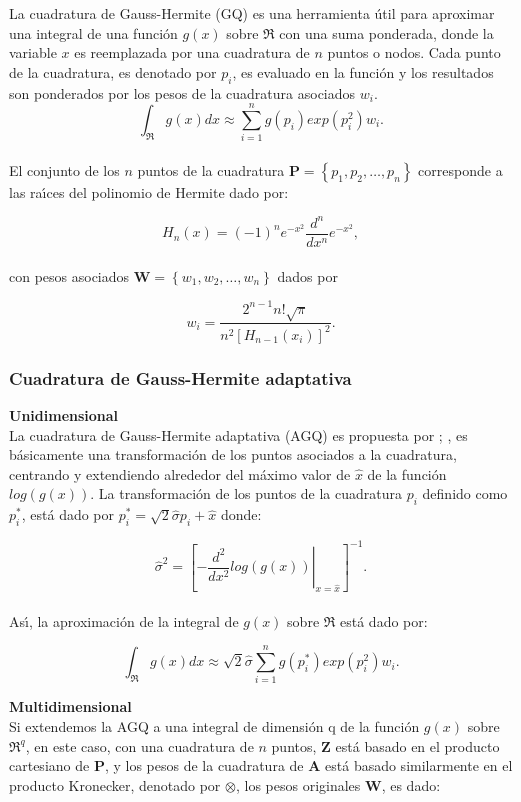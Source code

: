 La cuadratura de Gauss-Hermite (GQ) es una herramienta \'{u}til para aproximar una integral de una funci\'{o}n $g(x)$ sobre $\Re$ con una suma ponderada, donde la variable $x$ es reemplazada por una cuadratura de $n$ puntos o nodos. Cada punto de la cuadratura, es denotado por $p_i$, es evaluado en la funci\'{o}n y los resultados son ponderados por los pesos de la cuadratura asociados $w_i$.
\[
\int_\Re{g(x)dx}\approx\sum_{i=1}^{n}{g(p_i)exp(p_i^2)w_i.}
\]
\\
El conjunto de los $n$ puntos de la cuadratura $\textbf{P}=\left\{p_1,p_2,\ldots,p_n\right\}$ corresponde a las ra\'{\i}ces del polinomio de Hermite dado por:

\[
H_n{(x)}=(-1)^ne^{-x^2}\frac{d^n}{dx^n}e^{-x^2},
\]
\\
con pesos asociados $\textbf{W}=\left\{w_1,w_2,\ldots,w_n\right\}$ dados por

\[
w_i=\frac{2^{n-1}n!\sqrt{\pi}}{n^2{[H_{n-1}(x_i)]}^2}.
\]

\subsubsection{Cuadratura de Gauss-Hermite adaptativa}

\textbf{Unidimensional\\}
La cuadratura de Gauss-Hermite adaptativa (AGQ) es propuesta por \cite{Liu1}; \citep{Pinheiro1}, es b\'{a}sicamente una transformaci\'{o}n de los puntos asociados a la cuadratura, centrando y extendiendo alrededor del m\'{a}ximo valor de $\hat{x}$ de la funci\'{o}n $log(g(x))$. La transformaci\'{o}n de los puntos de la cuadratura $p_i$ definido como $p_i^*$, est\'{a} dado por $p_i^*=\sqrt{2}\hat{\sigma}p_i+\hat{x}$ donde:

\[
\hat{\sigma}^2={\left[\left. -\frac{d^2}{dx^2}log(g(x))\right|_{x=\hat{x}}\right]^{-1}}.
\]
\\
As\'{\i}, la aproximaci\'{o}n de la integral de $g(x)$ sobre $\Re$ est\'{a} dado por:

\[
\int_\Re{g(x)dx}\approx\sqrt{2}\hat{\sigma}\sum_{i=1}^{n}{g(p_i^*)exp(p_i^2)w_i.}
\]

\textbf{Multidimensional\\}
Si extendemos la AGQ a una integral de dimensi\'{o}n q de la funci\'{o}n $g(x)$ sobre $\Re^q$, en este caso, con una cuadratura de $n$ puntos, $\textbf{Z}$ est\'{a} basado en el producto cartesiano de $\textbf{P}$, y los pesos de la cuadratura de $\textbf{A}$ est\'{a} basado similarmente en el producto Kronecker, denotado por $\otimes$, los pesos originales $\textbf{W}$, es dado:

